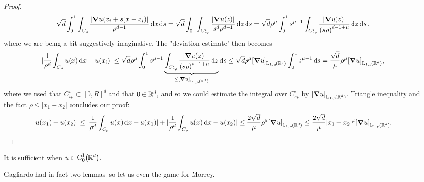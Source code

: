 \documentclass{article}
\begin{document}
\begin{proof}
	\[
		\sqrt{d}\int_0^1\int_{C_{\rho}}\frac{|\grad u(x_i + s(x - x_i)|}{\rho^{d-1}}\dd{x} \dd{s} =\sqrt{d} \int_0^1 \int_{C^i_{s \rho}}\frac{|\grad u(z)|}{s^d \rho^{d-1}}\dd{z}\dd{s} =\sqrt{d} \rho^{\mu} \int_0^1 s^{\mu-1} \int_{C_{s \rho}^i}\frac{|\grad u(z)|}{\qty(s \rho)^{d-1 + \mu}}\dd{z}\dd{s},
	\]
	where we are being a bit suggestively imaginative. The "deviation estimate" then becomes
	\[
		|\frac{1}{\rho^d}\int_{C_{\rho}}u(x)\dd{x} - u(x_i)| \leq \sqrt{d}\rho^{\mu}\int_0^1 s^{\mu-1} \underbrace{\int_{C^i_{s \rho}}\frac{|\grad u(z)|}{\qty(s \rho)^{d-1+\mu}}\dd{z}}_{\leq \qty[\grad u]_{\LpSet[1,\mu]{\R^{d}}}}\dd{s} \leq \sqrt{d} \rho^{\mu} \qty[\grad u]_{\LpSet[1,\mu]{\R^{d}}}\int_0^1 s^{\mu-1}\dd{s} = \frac{\sqrt{d}}{\mu}\rho^{\mu}\qty[\grad u]_{\LpSet[1,\mu]{\R^{d}}},
	\]
where we used that $C_{s \rho}^i \subset [0,R]^{d}$ and that $0 \in {\mathbb R}^{d},$ and so we could estimate the integral over $C_{s \rho}^i$ by $\qty[\grad u]_{\LpSet[1,\mu]{\R^{d}}}.$ Triangle inequality and the fact $\rho \leq |x_1 - x_2|$ concludes our proof:
\[
	|u(x_1) - u(x_2)| \leq |\frac{1}{\rho^d}\int_{C_{\rho}}u(x)\dd{x} - u(x_1)| + |\frac{1}{\rho^d}\int_{C_{\rho}}u(x)\dd{x} - u(x_2)| \leq \frac{2 \sqrt{d}}{\mu}\rho^{\mu} \qty[\grad u]_{\LpSet[1, \mu]{\R^{d}}} \leq \frac{2 \sqrt{d}}{\mu}|x_1 - x_2|^{\mu} \qty[\grad u]_{\LpSet[1,\mu]{\R^{d}}}.
\]
\end{proof}
\begin{remark}
    It is sufficient when $u \in \text{C}^1_0\qty({\mathbb R}^{d}).$
\end{remark}

Gagliardo had in fact two lemmas, so let us even the game for Morrey.
\end{document}
